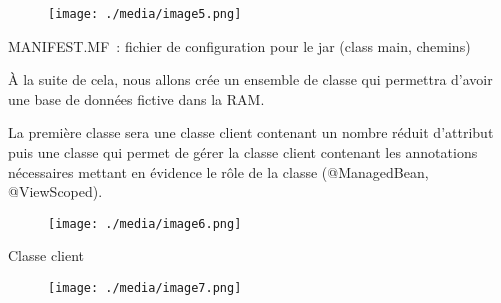 \documentclass[12pt]{article}
\begin{document}

\begin{figure}[H]
	\begin{Center}
		\texttt{[image: ./media/image5.png]}
	\end{Center}
\end{figure}



\par

\begin{Center}
MANIFEST.MF : fichier de configuration pour le jar (class main, chemins)
\end{Center}\par

À la suite de cela, nous allons crée un ensemble de classe qui permettra d’avoir une base de données fictive dans la RAM.\par

La première classe sera une classe client contenant un nombre réduit d’attribut puis une classe qui permet de gérer la classe client contenant les annotations nécessaires mettant en évidence le rôle de la classe (@ManagedBean, @ViewScoped). \par




\begin{figure}[H]
	\begin{Center}
		\texttt{[image: ./media/image6.png]}
	\end{Center}
\end{figure}



\par

\begin{Center}
Classe client
\end{Center}\par




\begin{figure}[H]
	\begin{Center}
		\texttt{[image: ./media/image7.png]}
	\end{Center}
\end{figure}
\end{document}
